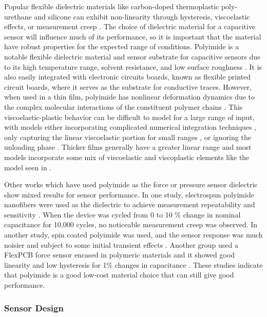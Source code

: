 Popular flexible dielectric materials like carbon-doped
 thermoplastic poly-urethane and silicone can exhibit non-linearity
 through hysteresis, viscoelastic effects, or measurement creep
 \cite{Shouten17,Wolter18,Dommelen20,Kisic19}.
The choice of dielectric material for a capacitive sensor will 
 influence much of its performance, so it is important that the material
 have robust properties for the expected range of conditions.
Polyimide %
is a notable flexible dielectric material and
 sensor substrate for capacitive sensors due to its high temperature range,
 solvent resistance, and low surface roughness \cite{Khan14}.
It is also easily integrated with electronic circuits boards, known as
 flexible printed circuit boards, where it serves as the substrate for conductive traces.
However, when used in a thin film, polyimide has nonlinear deformation dynamics due to the complex
 molecular interactions of the constituent polymer chains \cite{VALAVALA20071161}. 
This viscoelastic-plastic behavior can be difficult to model for a large range of input,
 with models either incorporating complicated numerical integration techniques
 \cite{dharmadasa20, li21},
 only capturing the linear viscoelastic portion for small ranges \cite{he16},
 or ignoring the unloading phase \cite{wang20}.
Thicker films generally have a greater linear range \cite{chang08} and most models
 incorporate some mix of viscoelastic and viscoplastic elements like the model seen
 in \cite{wei08}.

Other works which have used polyimide as the force or pressure sensor
 dielectric show mixed results for sensor performance.
In one study, electrospun polyimide nanofibers were used as the
 dielectric to achieve measurement repeatability and sensitivity \cite{zhu20}.
When the device was cycled from 0 to 10 \% change in nominal capacitance for 10,000 cycles,
 no noticeable measurement creep was observed.
In another study, spin coated polyimide was used, and the sensor response was much noisier
 and subject to some initial transient effects \cite{dobrzynska12}.
Another group used a FlexPCB force sensor encased in polymeric materials and
 it showed good linearity and low hysteresis for 1\% changes in capacitance \cite{Bodini19}.
These studies indicate that polyimide is a good low-cost material choice that can still give
 good performance.


\subsubsection{Sensor Design}

